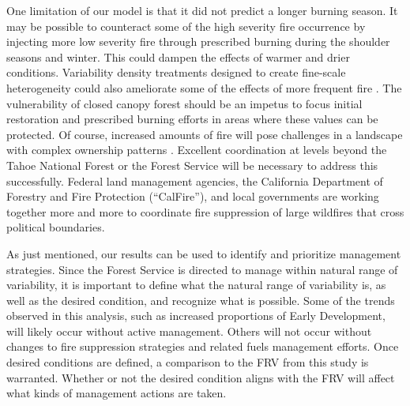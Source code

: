 One limitation of our model is that it did not predict a longer burning season. It may be possible to counteract some of the high severity fire occurrence by injecting more low severity fire through prescribed burning during the shoulder seasons and winter. This could dampen the effects of warmer and drier conditions. Variability density treatments designed to create fine-scale heterogeneity could also ameliorate some of the effects of more frequent fire \citep{Stephens2010,Knapp2012,North2012a}. The vulnerability of closed canopy forest should be an impetus to focus initial restoration and prescribed burning efforts in areas where these values can be protected. Of course, increased amounts of fire will pose challenges in a landscape with complex ownership patterns \citep{Stephens2013}. Excellent coordination at levels beyond the Tahoe National Forest or the Forest Service will be necessary to address this successfully. Federal land management agencies, the California Department of Forestry and Fire Protection (``CalFire''), and local governments are working together more and more to coordinate fire suppression of large wildfires that cross political boundaries.

As just mentioned, our results can be used to identify and prioritize management strategies. Since the Forest Service is directed to manage within natural range of variability, it is important to define what the natural range of variability is, as well as the desired condition, and recognize what is possible. Some of the trends observed in this analysis, such as increased proportions of Early Development, will likely occur without active management. Others will not occur without changes to fire suppression strategies and related fuels management efforts. Once desired conditions are defined, a comparison to the FRV from this study is warranted. Whether or not the desired condition aligns with the FRV will affect what kinds of management actions are taken.

